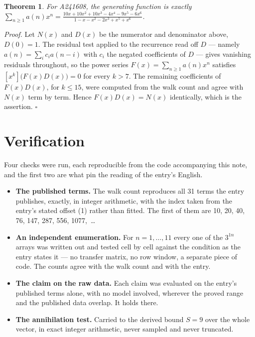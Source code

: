 \documentclass[11pt]{article}
\newtheorem{theorem}{Theorem}
\theoremstyle{definition}
\begin{document}
\begin{theorem} For A241608, the generating function is exactly $\sum_{n\ge 1} a(n)x^n = \frac{10x + 10x^{2} + 10x^{3} - 4x^{4} - 9x^{5} - 6x^{6}}{1 - x - x^{2} - 2x^{3} + x^{5} + x^{6}}$.\end{theorem}

{\itshape Proof.} Let $N(x)$ and $D(x)$ be the numerator and denominator above, $D(0)=1$. The residual test applied to the recurrence read off $D$ --- namely $a(n) = \sum_i c_i a(n-i)$ with $c_i$ the negated coefficients of $D$ --- gives vanishing residuals throughout, so the power series $F(x)=\sum_{n\ge 1}a(n)x^n$ satisfies $[x^k]\bigl(F(x)D(x)\bigr) = 0$ for every $k > 7$. The remaining coefficients of $F(x)D(x)$, for $k \le 15$, were computed from the walk count and agree with $N(x)$ term by term. Hence $F(x)D(x) = N(x)$ identically, which is the assertion. $\square$

\section{Verification}

Four checks were run, each reproducible from the code accompanying this note, and the first two are what pin the reading of the entry's English.

\begin{itemize}

\item {\bfseries The published terms.} The walk count reproduces all 31 terms the entry publishes, exactly, in integer arithmetic, with the index taken from the entry's stated offset (1) rather than fitted. The first of them are 10, 20, 40, 76, 147, 287, 556, 1077,~\dots

\item {\bfseries An independent enumeration.} For $n = 1,\dots,11$ every one of the $3^{1n}$ arrays was written out and tested cell by cell against the condition as the entry states it --- no transfer matrix, no row window, a separate piece of code. The counts agree with the walk count and with the entry.

\item {\bfseries The claim on the raw data.} Each claim was evaluated on the entry's published terms alone, with no model involved, wherever the proved range and the published data overlap. It holds there.

\item {\bfseries The annihilation test.} Carried to the derived bound $S = 9$ over the whole vector, in exact integer arithmetic, never sampled and never truncated.

\end{itemize}
\end{document}

